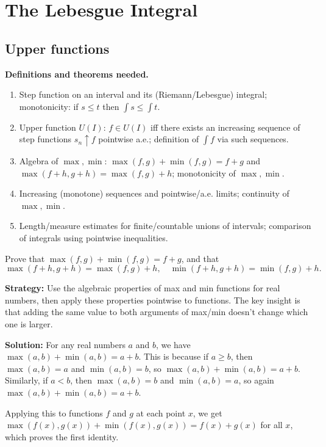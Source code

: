 \chapter{The Lebesgue Integral}

\section{Upper functions}

\noindent\textbf{Definitions and theorems needed.}
\begin{enumerate}[label=(\alph*)]
\item Step function on an interval and its (Riemann/Lebesgue) integral; monotonicity: if $s\le t$ then $\int s\le\int t$.
\item Upper function $U(I)$: $f\in U(I)$ iff there exists an increasing sequence of step functions $s_n\uparrow f$ pointwise a.e.; definition of $\int f$ via such sequences.
\item Algebra of $\max,\min$: $\max(f,g)+\min(f,g)=f+g$ and $\max(f+h,g+h)=\max(f,g)+h$; monotonicity of $\max,\min$.
\item Increasing (monotone) sequences and pointwise/a.e. limits; continuity of $\max,\min$.
\item Length/measure estimates for finite/countable unions of intervals; comparison of integrals using pointwise inequalities.
\end{enumerate}



\begin{problembox}
Prove that $\max(f, g) + \min(f, g) = f + g$, and that 
\[ \max(f + h, g + h) = \max(f, g) + h, \quad \min(f + h, g + h) = \min(f, g) + h. \]
\end{problembox}

\noindent\textbf{Strategy:} Use the algebraic properties of max and min functions for real numbers, then apply these properties pointwise to functions. The key insight is that adding the same value to both arguments of max/min doesn't change which one is larger.

\bigskip\noindent\textbf{Solution:}
For any real numbers $a$ and $b$, we have $\max(a, b) + \min(a, b) = a + b$. This is because if $a \geq b$, then $\max(a, b) = a$ and $\min(a, b) = b$, so $\max(a, b) + \min(a, b) = a + b$. Similarly, if $a < b$, then $\max(a, b) = b$ and $\min(a, b) = a$, so again $\max(a, b) + \min(a, b) = a + b$.

Applying this to functions $f$ and $g$ at each point $x$, we get $\max(f(x), g(x)) + \min(f(x), g(x)) = f(x) + g(x)$ for all $x$, which proves the first identity.

